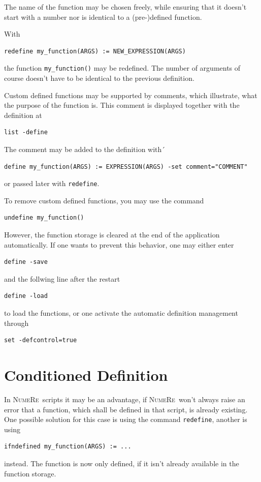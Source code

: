 \documentclass[DIV=14,headsepline,footsepline]{scrbook}
\newcommand{\NR}{\textsc{Nu\-me\-Re}}
\begin{document}
				The name of the function may be chosen freely, while ensuring that it doesn't start with a number nor is identical to a (pre-)defined function.
				
				With
				\begin{lstlisting}
redefine my_function(ARGS) := NEW_EXPRESSION(ARGS)
				\end{lstlisting}
				the function \lstinline+my_function()+ may be redefined. The number of arguments of course doesn't have to be identical to the previous definition.
				
				Custom defined functions may be supported by comments, which illustrate, what the purpose of the function is. This comment is displayed together with the definition at
				\begin{lstlisting}
list -define
				\end{lstlisting}
				
				The comment may be added to the definition with´
				\begin{lstlisting}
define my_function(ARGS) := EXPRESSION(ARGS) -set comment="COMMENT"
				\end{lstlisting}
				or passed later with \lstinline+redefine+.
				
				To remove custom defined functions, you may use the command
				\begin{lstlisting}
undefine my_function()
				\end{lstlisting}
				However, the function storage is cleared at the end of the application automatically. If one wants to prevent this behavior, one may either enter
				\begin{lstlisting}
define -save
				\end{lstlisting}
				and the follwing line after the restart
				\begin{lstlisting}
define -load
				\end{lstlisting}
				to load the functions, or one activate the automatic definition management through
				\begin{lstlisting}
set -defcontrol=true
				\end{lstlisting}
				
			\section{Conditioned Definition}
				In \NR\ scripts it may be an advantage, if \NR\ won't always raise an error that a function, which shall be defined in that script, is already existing. One possible solution for this case is using the command \lstinline+redefine+, another is using
				\begin{lstlisting}
ifndefined my_function(ARGS) := ...
				\end{lstlisting}
				instead. The function is now only defined, if it isn't already available in the function storage.
\end{document}
